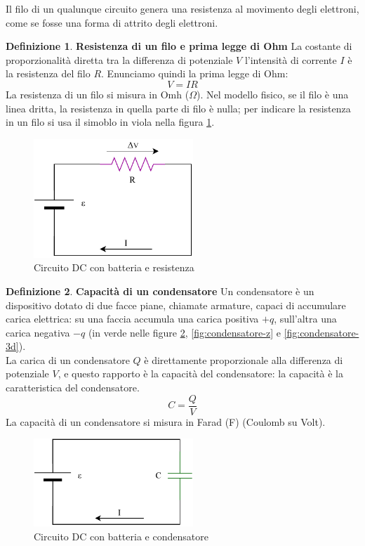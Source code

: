 \documentclass[a3paper, twoside, openany]{book}
\theoremstyle{definition}
\newtheorem{definition}{Definizione}
\begin{document}
Il filo di un qualunque circuito genera una resistenza al movimento degli elettroni, come se fosse una forma di attrito degli elettroni.
\begin{definition}{\textbf{Resistenza di un filo e prima legge di Ohm}}
La costante di proporzionalità diretta tra la differenza di potenziale $V$ l'intensità di corrente $I$ è la resistenza del filo $R$. Enunciamo quindi la prima legge di Ohm:$$V=IR$$ La resistenza di un filo si misura in Omh ($\Omega$). Nel modello fisico, se il filo è una linea dritta, la resistenza in quella parte di filo è nulla; per indicare la resistenza in un filo si usa il simoblo in viola nella figura \ref{fig:resistenza}.
\end{definition}
\begin{figure}[htp]
    \centering
    \includegraphics[width=6cm]{Circuito RC-Resistenza}
    \caption{Circuito DC con batteria e resistenza}
    \label{fig:resistenza}
\end{figure}
\begin{definition}{\textbf{Capacità di un condensatore}}
Un condensatore è un dispositivo dotato di due facce piane, chiamate armature, capaci di accumulare carica elettrica: su una faccia accumula una carica positiva $+q$, sull'altra una carica negativa $-q$ (in verde nelle figure \ref{fig:condensatore}, \ref{fig:condensatore-z} e \ref{fig:condensatore-3d}). \\ La carica di un condensatore $Q$ è direttamente proporzionale alla differenza di potenziale $V$, e questo rapporto è la capacità del condensatore: la capacità è la caratteristica del condensatore. $$C=\frac{Q}{V}$$ La capacità di un condensatore si misura in Farad (F) (Coulomb su Volt).
\end{definition}
\begin{figure}[htp]
    \centering
    \includegraphics[width=6cm]{Circuito RC-Condensatore}
    \caption{Circuito DC con batteria e condensatore}
    \label{fig:condensatore}
\end{figure}
\end{document}
